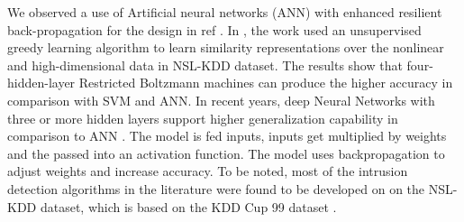 \documentclass[letterpaper, 10pt, conference]{ieeeconf} %
\begin{document}









 We observed a use of Artificial neural networks (ANN) with enhanced resilient back-propagation for the design  in ref \cite{Naoum2012}. In \cite{Gao2014}, the work used an unsupervised greedy learning algorithm to learn similarity representations over the nonlinear and high-dimensional data in NSL-KDD dataset. The results show that four-hidden-layer Restricted Boltzmann machines can produce the higher accuracy in comparison with SVM and ANN.  In recent years, deep Neural Networks with three or more hidden layers support higher generalization capability in comparison to ANN \cite{Kaynar2017}. The model is fed inputs, inputs get multiplied by weights and the passed into an activation function. The model uses backpropagation to adjust weights and increase accuracy. To be noted, most of the intrusion detection algorithms in the literature were found to be developed on on the NSL-KDD dataset, which is based on the KDD Cup 99 dataset \cite{NSLKDD}.
\end{document}
